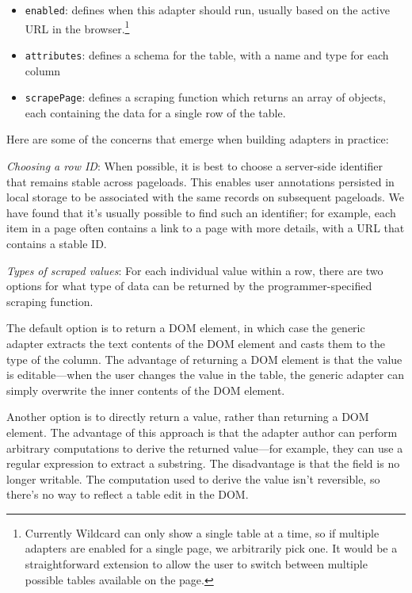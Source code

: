 \documentclass[sigplan,screen,10pt,anonymous,review]{acmart}
\providecommand{\tightlist}{%
  \setlength{\itemsep}{0pt}\setlength{\parskip}{0pt}}
\begin{document}
\begin{itemize}
\tightlist
\item
  \texttt{enabled}: defines when this adapter should run, usually based
  on the active URL in the browser.\footnote{Currently Wildcard can only
    show a single table at a time, so if multiple adapters are enabled
    for a single page, we arbitrarily pick one. It would be a
    straightforward extension to allow the user to switch between
    multiple possible tables available on the page.}
\item
  \texttt{attributes}: defines a schema for the table, with a name and
  type for each column
\item
  \texttt{scrapePage}: defines a scraping function which returns an
  array of objects, each containing the data for a single row of the
  table.
\end{itemize}

Here are some of the concerns that emerge when building adapters in
practice:

\emph{Choosing a row ID}: When possible, it is best to choose a
server-side identifier that remains stable across pageloads. This
enables user annotations persisted in local storage to be associated
with the same records on subsequent pageloads. We have found that it's
usually possible to find such an identifier; for example, each item in a
page often contains a link to a page with more details, with a URL that
contains a stable ID.

\emph{Types of scraped values}: For each individual value within a row,
there are two options for what type of data can be returned by the
programmer-specified scraping function.

The default option is to return a DOM element, in which case the generic
adapter extracts the text contents of the DOM element and casts them to
the type of the column. The advantage of returning a DOM element is that
the value is editable---when the user changes the value in the table,
the generic adapter can simply overwrite the inner contents of the DOM
element.

Another option is to directly return a value, rather than returning a
DOM element. The advantage of this approach is that the adapter author
can perform arbitrary computations to derive the returned value---for
example, they can use a regular expression to extract a substring. The
disadvantage is that the field is no longer writable. The computation
used to derive the value isn't reversible, so there's no way to reflect
a table edit in the DOM.
\end{document}
